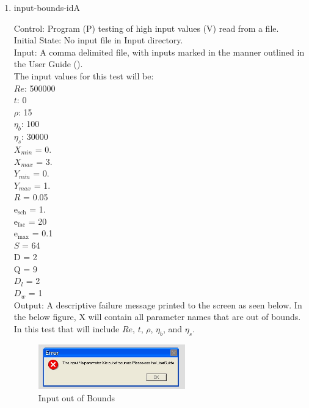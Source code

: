\documentclass[12pt, titlepage]{article}
\newcounter{testcounter} %
\begin{document}
\begin{enumerate}			
					
\item{input-bounds-id\thetestcounter A \label{inputboundstest}\\}

Control: Program (P) testing of high input values (V) read from a file.\\
					
Initial State: No input file in Input directory.\\
					
Input: A comma delimited file, with inputs marked in the manner outlined in the User Guide (\citet{LBM_UserGuide_PM}).\\The input values for this test will be:\\$Re$: 500000\\
$t$: 0\\
$\rho$: 15\\
$\eta_b$: 100\\
$\eta_s$: 30000\\
$X_{min}$ = 0.\\
$X_{max}$ = 3.\\
$Y_{min}$ = 0.\\
$Y_{max}$ = 1.\\
$R$ = 0.05\\
$\mathrm{e_{sch}}$ = 1.\\
$\mathrm{e_{fac}}$ = 20\\
$\mathrm{e_{max}}$ = 0.1\\
$S$ = 64\\
$\mathrm{D}$ = 2\\
$\mathrm{Q}$ = 9\\
$D_{l}$ = 2\\
$D_{w}$ = 1\\

					
Output: A descriptive failure message printed to the screen as seen below. In the below figure, X will contain all parameter names that are out of bounds. In this test that will include $Re$, $t$, $\rho$, $\eta_b$, and $\eta_s$.

\begin{figure}[h!]
\begin{center}
\includegraphics[width=0.6\textwidth]{errorMessage.jpeg}
\caption{Input out of Bounds}
\label{Fig_InputError}
\end{center}
\end{figure}


\end{enumerate}
\end{document}

